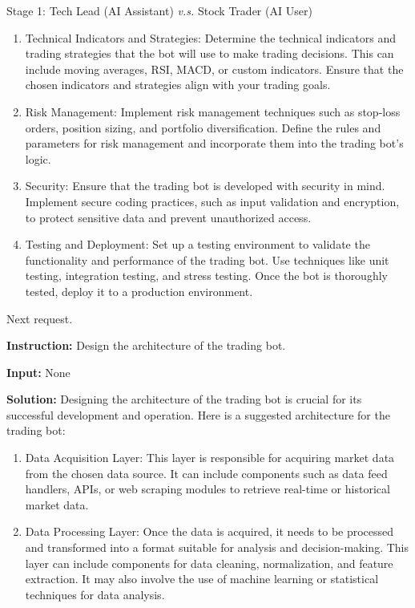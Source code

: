 \begin{AIBoxBreak}{Stage 1: Tech Lead (AI Assistant) \textit{v.s.} Stock Trader (AI User)}
\begin{enumerate}
\item  Technical Indicators and Strategies: Determine the technical indicators and trading strategies that the bot will use to make trading decisions. This can include moving averages, RSI, MACD, or custom indicators. Ensure that the chosen indicators and strategies align with your trading goals.

\item  Risk Management: Implement risk management techniques such as stop-loss orders, position sizing, and portfolio diversification. Define the rules and parameters for risk management and incorporate them into the trading bot’s logic.

\item  Security: Ensure that the trading bot is developed with security in mind. Implement secure coding practices, such as input validation and encryption, to protect sensitive data and prevent unauthorized access.

\item  Testing and Deployment: Set up a testing environment to validate the functionality and performance of the trading bot. Use techniques like unit testing, integration testing, and stress testing. Once the bot is thoroughly tested, deploy it to a production environment.
\end{enumerate}

Next request.


\usermsg

\textbf{Instruction:} Design the architecture of the trading bot.

\textbf{Input:} None


\assistantmsg

\textbf{Solution:} Designing the architecture of the trading bot is crucial for its successful development and operation. Here is a suggested architecture for the trading bot:

\begin{enumerate}
\item  Data Acquisition Layer: This layer is responsible for acquiring market data from the chosen data source. It can include components such as data feed handlers, APIs, or web scraping modules to retrieve real-time or historical market data.

\item  Data Processing Layer: Once the data is acquired, it needs to be processed and transformed into a format suitable for analysis and decision-making. This layer can include components for data cleaning, normalization, and feature extraction. It may also involve the use of machine learning or statistical techniques for data analysis.


\end{enumerate}
\end{AIBoxBreak}
